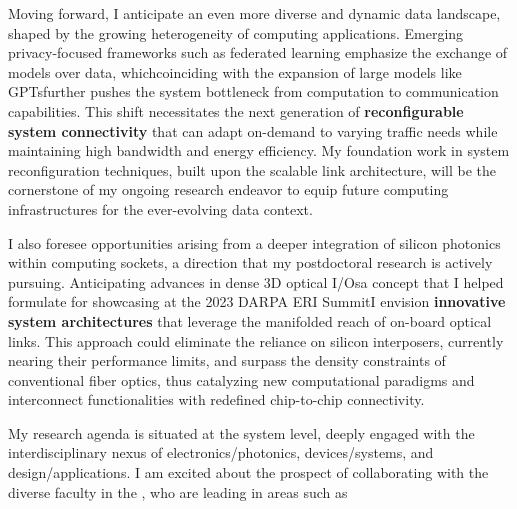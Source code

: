 Moving forward, I anticipate an even more diverse and dynamic data landscape, shaped by the growing heterogeneity of computing applications. Emerging privacy-focused frameworks such as federated learning emphasize the exchange of models over data, which\textemdash coinciding with the expansion of large models like GPTs\textemdash further pushes the system bottleneck from computation to communication capabilities. This shift necessitates the next generation of \textbf{reconfigurable system connectivity} that can adapt on-demand to varying traffic needs while maintaining high bandwidth and energy efficiency. My foundation work in system reconfiguration techniques, built upon the scalable link architecture, will be the cornerstone of my ongoing research endeavor to equip future computing infrastructures for the ever-evolving data context.

I also foresee opportunities arising from a deeper integration of silicon photonics within computing sockets, a direction that my postdoctoral research is actively pursuing. Anticipating advances in dense 3D optical I/Os\textemdash a concept that I helped formulate for showcasing at the 2023 DARPA ERI Summit\textemdash I envision \textbf{innovative system architectures} that leverage the manifolded reach of on-board optical links. This approach could eliminate the reliance on silicon interposers, currently nearing their performance limits, and surpass the density constraints of conventional fiber optics, thus catalyzing new computational paradigms and interconnect functionalities with redefined chip-to-chip connectivity.

My research agenda is situated at the system level, deeply engaged with the interdisciplinary nexus of electronics/photonics, devices/systems, and design/applications. I am excited about the prospect of collaborating with the diverse faculty in the \appDept{}, who are leading in areas such as%